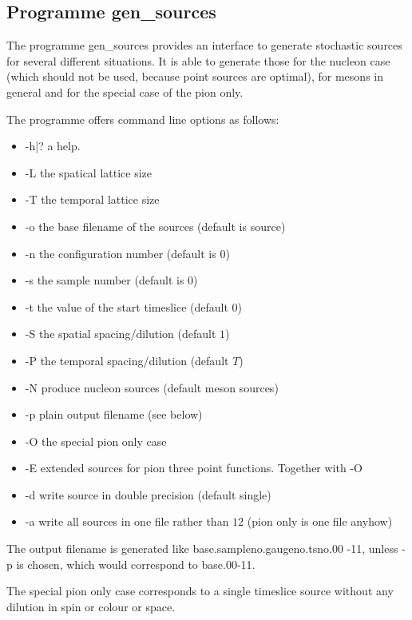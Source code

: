 \subsection{Programme {\ttfamily gen\_sources}}

The programme {\ttfamily gen\_sources} provides an interface to
generate stochastic sources for several different situations. It is
able to generate those for the nucleon case (which should not be used,
because point sources are optimal), for mesons in general and for the
special case of the pion only.

The programme offers command line options as follows:
\begin{itemize}
\item {\ttfamily -h|?} a help.
\item {\ttfamily -L} the spatical lattice size
\item {\ttfamily -T} the temporal lattice size
\item {\ttfamily -o} the base filename of the sources (default is
  {\ttfamily source})
\item {\ttfamily -n} the configuration number (default is $0$)
\item {\ttfamily -s} the sample number (default is $0$)
\item {\ttfamily -t} the value of the start timeslice (default $0$)
\item {\ttfamily -S} the spatial spacing/dilution (default $1$)
\item {\ttfamily -P} the temporal spacing/dilution (default $T$)
\item {\ttfamily -N} produce nucleon sources (default meson sources)
\item {\ttfamily -p} plain output filename (see below)
\item {\ttfamily -O} the special pion only case
\item {\ttfamily -E} extended sources for pion three point
  functions. Together with {\ttfamily -O}
\item {\ttfamily -d} write source in double precision (default single)
\item {\ttfamily -a} write all sources in one file rather than $12$
  (pion only is one file anyhow)
\end{itemize}
The output filename is generated like {\ttfamily
  base.sampleno.gaugeno.tsno.00 -11}, unless {\ttfamily -p} is chosen,
which would correspond to {\ttfamily base.00-11}.

The special pion only case corresponds to a single timeslice source
without any dilution in spin or colour or space.

\endinput

